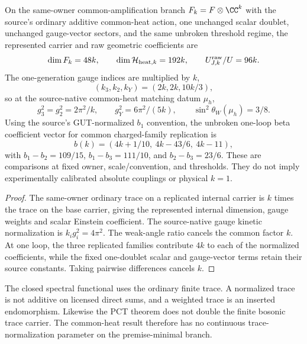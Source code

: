 \documentclass[12pt,a4paper]{article}
\begin{document}
\begin{proposition}
\label{p5:prop:v329-commoncopy-heat-gauge-routing}
On the same-owner common-amplification branch $F_k=F\otimes\CC^k$
with the source's ordinary additive common-heat action, one unchanged
scalar doublet, unchanged gauge-vector sectors, and the same unbroken
threshold regime, the represented carrier and raw geometric coefficients are
\[
 \dim F_k=48k,\qquad
 \dim\mathcal H_{{\rm heat},k}=192k,\qquad
 U_{J,k}^{\rm raw}/U=96k.
\]
The one-generation gauge indices are multiplied by $k$,
\[
 (k_3,k_2,k_Y)=(2k,2k,10k/3),
\]
so at the source-native common-heat matching datum $\mu_h$,
\[
 g_3^2=g_2^2=2\pi^2/k,\qquad
 g_Y^2=6\pi^2/(5k),\qquad
 \sin^2\theta_W(\mu_h)=3/8.
\]
Using the source's GUT-normalized $b_1$ convention, the unbroken
one-loop beta coefficient vector for common charged-family
replication is
\[
 b(k)=(4k+1/10,\ 4k-43/6,\ 4k-11),
\]
with $b_1-b_2=109/15$, $b_1-b_3=111/10$, and $b_2-b_3=23/6$.
These are comparisons at fixed owner, scale/convention, and thresholds.
They do not imply experimentally calibrated absolute couplings or
physical $k=1$.
\end{proposition}
\begin{proof}
The same-owner ordinary trace on a replicated internal carrier is
$k$ times the trace on the base carrier, giving the represented
internal dimension, gauge weights and scalar Einstein coefficient.
The source-native gauge kinetic normalization is $k_i g_i^2=4\pi^2$.
The weak-angle ratio cancels the common factor $k$. At one loop, the
three replicated families contribute $4k$ to each of the normalized
coefficients, while the fixed one-doublet scalar and gauge-vector
terms retain their source constants. Taking pairwise differences
cancels $k$.
\end{proof}


\begin{remark}
\label{p5:rem:no-pct-trace-doubling}
The closed spectral functional uses the ordinary finite trace.  A normalized
trace is not additive on licensed direct sums, and a weighted trace is an
inserted endomorphism.  Likewise the PCT theorem does not double the finite
bosonic trace carrier.  The common-heat result therefore has no continuous
trace-normalization parameter on the premise-minimal branch.
\end{remark}
\end{document}
